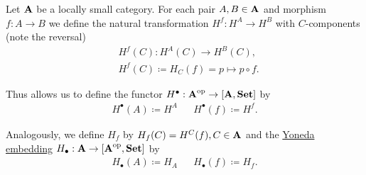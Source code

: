 \begin{definition}\label{def:yoneda_embedding}\cite[definitions 4.1.15, 4.1.21]{Leinster2014}
  Let $\operatorname{\mathbf{A}}$ be a locally small category. For each pair $A, B \in \operatorname{\mathbf{A}}$ and morphism $f: A \to B$ we define the natural transformation $H^f: H^A \to H^B$ with $C$-components (note the reversal)
  \begin{align*}
    &H^f(C): H^A(C) \to H^B(C), \\
    &H^f(C) \coloneqq H_C(f) = p \mapsto p \circ f.
  \end{align*}

  Thus allows us to define the functor $H^\bullet: \operatorname{\mathbf{A}}^{\operatorname{op}} \to [\operatorname{\mathbf{A}}, \operatorname{\mathbf{Set}}]$ by
  \begin{align*}
    H^\bullet(A) \coloneqq H^A && H^\bullet(f) \coloneqq H^f.
  \end{align*}

  Analogously, we define $H_f$ by $H_f(C) = H^C(f), C \in \operatorname{\mathbf{A}}$ and the \uline{Yoneda embedding} $H_\bullet: \operatorname{\mathbf{A}} \to [\operatorname{\mathbf{A}}^{\operatorname{op}}, \operatorname{\mathbf{Set}}]$ by
  \begin{align*}
    H_\bullet(A) \coloneqq H_A && H_\bullet(f) \coloneqq H_f.
  \end{align*}
\end{definition}

